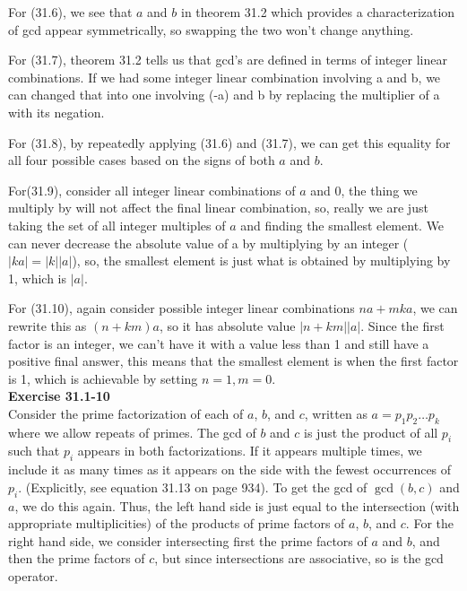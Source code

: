 \documentclass{article}
\begin{document}
For (31.6), we see that $a$ and $b$ in theorem 31.2 which provides a characterization of gcd appear symmetrically, so swapping the two won't change anything.

For (31.7), theorem 31.2 tells us that gcd's are defined in terms of integer linear combinations. If we had some integer linear combination involving a and b, we can changed that into one involving (-a) and b by replacing the multiplier of a with its negation.

For (31.8), by repeatedly applying (31.6) and (31.7), we can get this equality for all four possible cases based on the signs of both $a$ and $b$.

For(31.9), consider all integer linear combinations of $a$ and $0$, the thing we multiply  by will not affect the final linear combination, so, really we are just taking the set of all integer multiples of $a$ and finding the smallest element. We can never decrease the absolute value of a by multiplying by an integer ($|ka| = |k||a|$), so, the smallest element is just what is obtained by multiplying by 1, which is $|a|$.

For (31.10), again consider possible integer linear combinations $na + mka$, we can rewrite this as $(n+km)a$, so it has absolute value $|n+km||a|$. Since the first factor is an integer, we can't have it with a value less than 1 and still have a positive final answer, this means that the smallest element is when the first factor is 1, which is achievable by setting $n=1,m=0$.\\

\noindent\textbf{Exercise 31.1-10}\\

Consider the prime factorization of each of $a$, $b$, and $c$, written as $a = p_1p_2\ldots p_k$ where we allow repeats of primes.  The gcd of $b$ and $c$ is just the product of all $p_i$ such that $p_i$ appears in both factorizations.  If it appears multiple times, we include it as many times as it appears on the side with the fewest occurrences of $p_i$. (Explicitly, see equation 31.13 on page 934).  To get the gcd of $\gcd(b,c)$ and $a$, we do this again.  Thus, the left hand side is just equal to the intersection (with appropriate multiplicities) of the products of prime factors of $a$, $b$, and $c$.  For the right hand side, we consider intersecting first the prime factors of $a$ and $b$, and then the prime factors of $c$, but since intersections are associative, so is the gcd operator. \\
\end{document}
